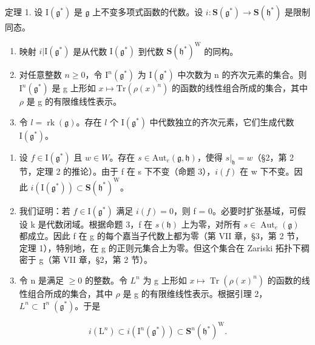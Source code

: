 定理 1. 设 \(\mathrm{I}(\mathfrak{g}^*)\) 是 \(\mathfrak{g}\) 上不变多项式函数的代数。设 \(i: \mathbf{S}(\mathfrak{g}^*) \to \mathbf{S}(\mathfrak{h}^*)\) 是限制同态。

\begin{enumerate}
\def\labelenumi{(\roman{enumi})}
\item
  映射 \(i|\mathrm{I}(\mathfrak{g}^*)\) 是从代数 \(\mathrm{I}(\mathfrak{g}^*)\) 到代数 \(\mathbf{S}(\mathfrak{h}^*)^{\mathrm{W}}\) 的同构。
\item
  对任意整数 \(n \geq 0\)，令 \(\mathrm{I}^{n}(\mathfrak{g}^{*})\) 为 \(\mathrm{I}(\mathfrak{g}^{*})\) 中次数为 n 的齐次元素的集合。则 \(\mathrm{I}^{n}(\mathfrak{g}^{*})\) 是 g 上形如 \(x \mapsto \mathrm{Tr}(\rho(x)^{n})\) 的函数的线性组合所成的集合，其中 \(\rho\) 是 g 的有限维线性表示。
\item
  令 \(l = \operatorname{rk}(\mathfrak{g})\)。存在 \(l\) 个 \(\mathrm{I}(\mathfrak{g}^*)\) 中代数独立的齐次元素，它们生成代数 \(\mathrm{I}(\mathfrak{g}^*)\)。
\end{enumerate}

\begin{enumerate}
\def\labelenumi{\alph{enumi})}
\item
  设 \(f \in \mathrm{I}(\mathfrak{g}^{*})\) 且 \(w \in W\)。存在 \(s \in \mathrm{Aut}_{e}(\mathfrak{g}, \mathfrak{h})\)，使得 \(s|_{\mathfrak{h}} = w\)（§2，第 2 节，定理 2 的推论）。由于 f 在 s 下不变（命题 3），\(i(f)\) 在 w 下不变。因此 \(i(\mathrm{I}(\mathfrak{g}^{*})) \subset \mathbf{S}(\mathfrak{h}^{*})^{\mathrm{W}}\)。
\item
  我们证明：若 \(f \in \mathrm{I}(\mathfrak{g}^{*})\) 满足 \(i(f) = 0\)，则 f = 0。必要时扩张基域，可假设 k 是代数闭域。根据命题 3，f 在 \(s(\mathfrak{h})\) 上为零，对所有 \(s \in \operatorname{Aut}_{e}(\mathfrak{g})\) 都成立。因此 f 在 g 的每个嘉当子代数上都为零（第 VII 章，§3，第 2 节，定理 1），特别地，在 g 的正则元集合上为零。但这个集合在 Zariski 拓扑下稠密于 g（第 VII 章，§2，第 2 节）。
\item
  令 n 是满足 \(\geq 0\) 的整数。令 \(L^{n}\) 为 g 上形如 \(x \mapsto \operatorname{Tr}(\rho(x)^{n})\) 的函数的线性组合所成的集合，其中 \(\rho\) 是 g 的有限维线性表示。根据引理 2，\(L^{n} \subset \operatorname{I}^{n}(\mathfrak{g}^{*})\)。于是
\end{enumerate}

\[
i \left(\mathrm{L} ^ {n}\right) \subset i \left(\mathrm{I} ^ {n} \left(\mathfrak {g} ^ {*}\right)\right) \subset \mathbf {S} ^ {n} \left(\mathfrak {h} ^ {*}\right) ^ {\mathrm{W}}.
\]

